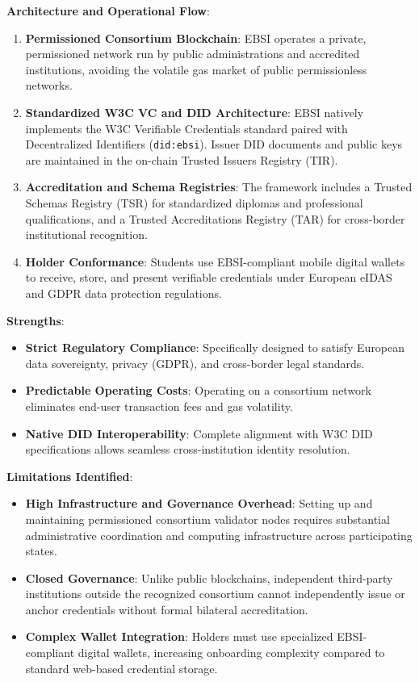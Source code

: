 \textbf{Architecture and Operational Flow}:
\begin{enumerate}
    \item \textbf{Permissioned Consortium Blockchain}: EBSI operates a private, permissioned network run by public administrations and accredited institutions, avoiding the volatile gas market of public permissionless networks.
    \item \textbf{Standardized W3C VC and DID Architecture}: EBSI natively implements the W3C Verifiable Credentials standard paired with Decentralized Identifiers (\texttt{did:ebsi}). Issuer DID documents and public keys are maintained in the on-chain Trusted Issuers Registry (TIR).
    \item \textbf{Accreditation and Schema Registries}: The framework includes a Trusted Schemas Registry (TSR) for standardized diplomas and professional qualifications, and a Trusted Accreditations Registry (TAR) for cross-border institutional recognition.
    \item \textbf{Holder Conformance}: Students use EBSI-compliant mobile digital wallets to receive, store, and present verifiable credentials under European eIDAS and GDPR data protection regulations.
\end{enumerate}

\textbf{Strengths}:
\begin{itemize}
    \item \textbf{Strict Regulatory Compliance}: Specifically designed to satisfy European data sovereignty, privacy (GDPR), and cross-border legal standards.
    \item \textbf{Predictable Operating Costs}: Operating on a consortium network eliminates end-user transaction fees and gas volatility.
    \item \textbf{Native DID Interoperability}: Complete alignment with W3C DID specifications allows seamless cross-institution identity resolution.
\end{itemize}

\textbf{Limitations Identified}:
\begin{itemize}
    \item \textbf{High Infrastructure and Governance Overhead}: Setting up and maintaining permissioned consortium validator nodes requires substantial administrative coordination and computing infrastructure across participating states.
    \item \textbf{Closed Governance}: Unlike public blockchains, independent third-party institutions outside the recognized consortium cannot independently issue or anchor credentials without formal bilateral accreditation.
    \item \textbf{Complex Wallet Integration}: Holders must use specialized EBSI-compliant digital wallets, increasing onboarding complexity compared to standard web-based credential storage.
\end{itemize}

